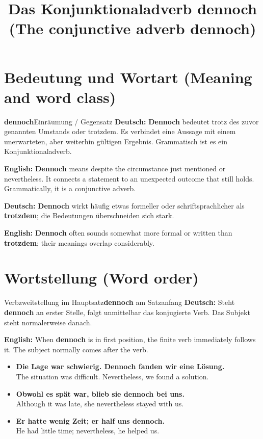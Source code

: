\documentclass[a4paper,11pt]{article}
\title{Das Konjunktionaladverb \glqq dennoch\grqq{} \textnormal{(The conjunctive adverb \glqq dennoch\grqq)}}\date{}
\newcommand{\GermanText}[1]{\textbf{Deutsch: }#1\par}\newcommand{\EnglishText}[1]{{\small\color{SoftGray}\textbf{English: }#1\par}}\newcommand{\ExampleItem}[2]{\item \textbf{#1}\\{\small\color{SoftGray}#2}}
\begin{document}
\maketitle\tableofcontents\newpage
\section{Bedeutung und Wortart \textnormal{(Meaning and word class)}}
\begin{grammarentry}{\textbf{dennoch}}{Einräumung / Gegensatz}
\GermanText{\textbf{Dennoch} bedeutet \glqq trotz des zuvor genannten Umstands\grqq{} oder \glqq trotzdem\grqq. Es verbindet eine Aussage mit einem unerwarteten, aber weiterhin gültigen Ergebnis. Grammatisch ist es ein Konjunktionaladverb.}
\EnglishText{\textbf{Dennoch} means \glqq despite the circumstance just mentioned\grqq{} or \glqq nevertheless\grqq. It connects a statement to an unexpected outcome that still holds. Grammatically, it is a conjunctive adverb.}
\GermanText{\textbf{Dennoch} wirkt häufig etwas formeller oder schriftsprachlicher als \textbf{trotzdem}; die Bedeutungen überschneiden sich stark.}
\EnglishText{\textbf{Dennoch} often sounds somewhat more formal or written than \textbf{trotzdem}; their meanings overlap considerably.}
\end{grammarentry}

\section{Wortstellung \textnormal{(Word order)}}
\begin{grammarentry}{Verbzweitstellung im Hauptsatz}{\textbf{dennoch} am Satzanfang}
\GermanText{Steht \textbf{dennoch} an erster Stelle, folgt unmittelbar das konjugierte Verb. Das Subjekt steht normalerweise danach.}
\EnglishText{When \textbf{dennoch} is in first position, the finite verb immediately follows it. The subject normally comes after the verb.}
\end{grammarentry}
\begin{exbox}\begin{itemize}
\ExampleItem{Die Lage war schwierig. Dennoch fanden wir eine Lösung.}{The situation was difficult. Nevertheless, we found a solution.}
\ExampleItem{Obwohl es spät war, blieb sie dennoch bei uns.}{Although it was late, she nevertheless stayed with us.}
\ExampleItem{Er hatte wenig Zeit; er half uns dennoch.}{He had little time; nevertheless, he helped us.}
\end{itemize}\end{exbox}
\end{document}
